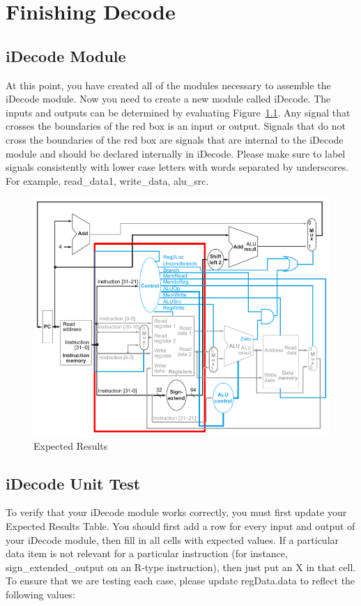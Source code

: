 \chapter{Finishing Decode}

\section{iDecode Module}
At this point, you have created all of the modules necessary to assemble the iDecode module.  Now you need to create a new module called iDecode.  The inputs and outputs can be determined by evaluating Figure~\ref{fig:decode_stage}.  Any signal that crosses the boundaries of the red box is an input or output.  Signals that do not cross the boundaries of the red box are signals that are internal to the iDecode module and should be declared internally in iDecode.  Please make sure to label signals consistently with lower case letters with words separated by underscores.  For example, read\_data1, write\_data, alu\_src.

\begin{figure}
	\caption{Expected Results}\label{fig:decode_stage}
	\begin{center}
		\includegraphics[width=4.75in]{../images/decode_stage.png}
	\end{center}
\end{figure} 


\section{iDecode Unit Test}
To verify that your iDecode module works correctly, you must first update your Expected Results Table. You should first add a row for every input and output of your iDecode module, then fill in all cells with expected values.  If a particular data item is not relevant for a particular instruction (for instance, sign\_extended\_output on an R-type instruction), then just put an X in that cell.  To ensure that we are testing each case, please update regData.data to reflect the following values:

